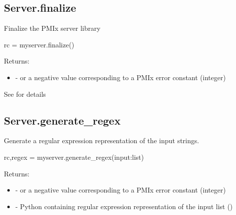 \subsection{Server.finalize}

\summary Finalize the \ac{PMIx} server library

\format

\pyspecificstart
\begin{codepar}
rc = myserver.finalize()
\end{codepar}
\pyspecificend


Returns:

\begin{itemize}
    \item {} -  or a negative value corresponding to a PMIx error constant (integer)
\end{itemize}


See  for details


\subsection{Server.generate_regex}

\summary
Generate a regular expression representation of the input strings.

\format

\pyspecificstart
\begin{codepar}
rc,regex = myserver.generate_regex(input:list)
\end{codepar}
\pyspecificend


\begin{arglist}
\end{arglist}

Returns:

\begin{itemize}
    \item {} -  or a negative value corresponding to a PMIx error constant (integer)
    \item {} - Python  containing regular expression representation of the input list ()
\end{itemize}



